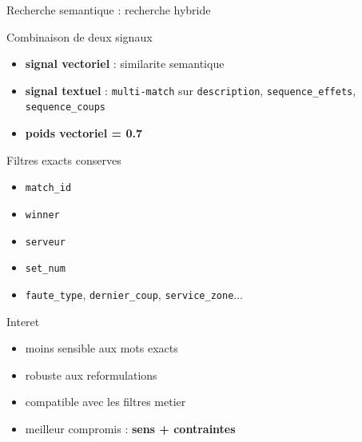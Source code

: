 \documentclass[aspectratio=169, 11pt]{beamer}
\begin{document}
\begin{frame}{Recherche semantique : recherche hybride}
    {\small
    \begin{block}{Combinaison de deux signaux}
        \begin{itemize}
            \item \textbf{signal vectoriel} : similarite semantique
            \item \textbf{signal textuel} : \texttt{multi-match} sur
            \texttt{description}, \texttt{sequence\_effets}, \texttt{sequence\_coups}
            \item \textbf{poids vectoriel = 0.7}
        \end{itemize}
    \end{block}

    \begin{block}{Filtres exacts conserves}
        \begin{itemize}
            \item \texttt{match\_id}
            \item \texttt{winner}
            \item \texttt{serveur}
            \item \texttt{set\_num}
            \item \texttt{faute\_type}, \texttt{dernier\_coup}, \texttt{service\_zone}...
        \end{itemize}
    \end{block}

    \begin{alertblock}{Interet}
        \begin{itemize}
            \item moins sensible aux mots exacts
            \item robuste aux reformulations
            \item compatible avec les filtres metier
            \item meilleur compromis : \textbf{sens + contraintes}
        \end{itemize}
    \end{alertblock}
    }
\end{frame}
\end{document}
